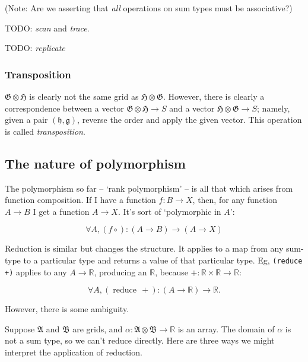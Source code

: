 \documentclass[11pt]{article}
\newcommand{\gr}[1]{\mathfrak{#1}}
\newcommand{\R}{\mathbb{R}}
\begin{document}
(Note: Are we asserting that \emph{all} operations on sum types must be associative?)

TODO: \emph{scan} and \emph{trace}. 

TODO: \emph{replicate}

\subsubsection{Transposition}
\label{sec:org68e418b}

\(\gr{G}\otimes\gr{H}\) is clearly not the same grid as
\(\gr{H}\otimes\gr{G}\). However, there is clearly a correspondence between a
vector \(\gr{G}\otimes\gr{H}\to S\) and a vector \(\gr{H}\otimes\gr{G}\to
S\); namely, given a pair \((\gr{h}, \gr{g})\), reverse the order and apply the
given vector. This operation is called \emph{transposition}. 

\subsection{The nature of polymorphism}
\label{sec:orgd61f222}

The polymorphism so far -- ‘rank polymorphism’ -- is all that which arises from
function composition. If I have a function \(f:B\to X\), then, for any function
\(A\to B\) I get a function \(A\to X\). It's sort of ‘polymorphic in \(A\)’:

$$
\forall A, (f\circ) : (A\to B)\to (A\to X)
$$

Reduction is similar but changes the structure. It applies to a map from any
sum-type to a particular type and returns a value of that particular type. Eg,
\texttt{(reduce +)} applies to any \(A\to\R\), producing an \(\R\), because
\(+:\R\times\R\to\R\):

$$
\forall A, (\operatorname{reduce}\, +) : (A \to \R)\to \R.
$$

However, there is some ambiguity. 

Suppose \(\gr{A}\) and \(\gr{B}\) are grids, and \(\alpha : \gr{A}\otimes\gr{B}\to\R\)
is an array. The domain of \(\alpha\) is not a sum type, so we can't reduce
directly. Here are three ways we might interpret the application of reduction. 
\end{document}
